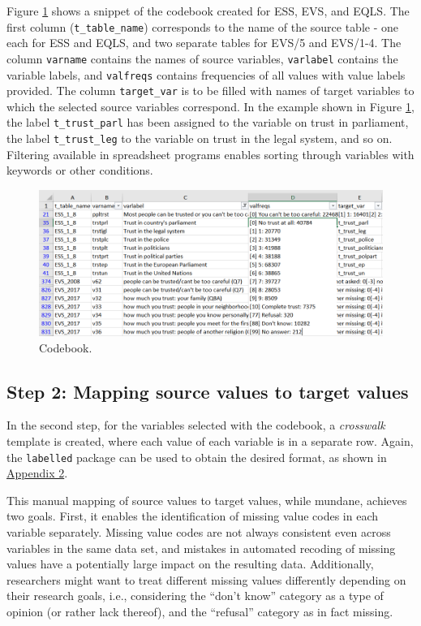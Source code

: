 \documentclass[12pt,]{article}
\begin{document}
Figure \ref{fig:codebook} shows a snippet of the codebook created for ESS, EVS, and EQLS. The first column (\texttt{t\_table\_name}) corresponds to the name of the source table - one each for ESS and EQLS, and two separate tables for EVS/5 and EVS/1-4. The column \texttt{varname} contains the names of source variables, \texttt{varlabel} contains the variable labels, and \texttt{valfreqs} contains frequencies of all values with value labels provided. The column \texttt{target\_var} is to be filled with names of target variables to which the selected source variables correspond. In the example shown in Figure \ref{fig:codebook}, the label \texttt{t\_trust\_parl} has been assigned to the variable on trust in parliament, the label \texttt{t\_trust\_leg} to the variable on trust in the legal system, and so on. Filtering available in spreadsheet programs enables sorting through variables with keywords or other conditions.

\begin{figure}[H]
\includegraphics[width=465px]{pictures/codebook_full} \caption{Codebook.}\label{fig:codebook}
\end{figure}

\hypertarget{step-2-mapping-source-values-to-target-values}{%
\subsection{Step 2: Mapping source values to target values}\label{step-2-mapping-source-values-to-target-values}}

In the second step, for the variables selected with the codebook, a \emph{crosswalk} template is created, where each value of each variable is in a separate row. Again, the \texttt{labelled} package can be used to obtain the desired format, as shown in \protect\hyperlink{appendix2}{Appendix 2}.

This manual mapping of source values to target values, while mundane, achieves two goals. First, it enables the identification of missing value codes in each variable separately. Missing value codes are not always consistent even across variables in the same data set, and mistakes in automated recoding of missing values have a potentially large impact on the resulting data. Additionally, researchers might want to treat different missing values differently depending on their research goals, i.e., considering the ``don't know'' category as a type of opinion (or rather lack thereof), and the ``refusal'' category as in fact missing.
\end{document}
